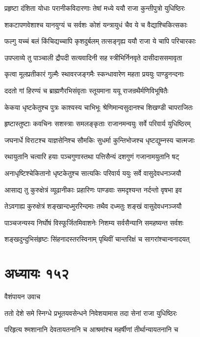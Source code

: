 \twolineshloka
{प्रहृष्टा दंशिता योधाः परानीकविदारणाः}
{तेषां मध्ये ययौ राजा कुन्तीपुत्रो युधिष्ठिरः}


\twolineshloka
{शकटापणवेशाश्च यानयुग्यं च सर्वशः}
{कोशं यन्त्रायुधं चैव ये च वैद्याश्चिकित्सकाः}


\twolineshloka
{फल्गु यच्चं बलं किंचिद्यच्चापि कृशदुर्बलम्}
{तत्सङ्गृह्य ययौ राजा ये चापि परिचारकाः}


\twolineshloka
{उपप्लाव्ये तु पाञ्चाली द्रौपदी सत्यवादिनी}
{सह स्त्रीभिर्निनवृते दासीदाससमावृता}


\twolineshloka
{कृत्वा मूलप्रतीकारं गुल्मैः स्थावरजङ्गमैः}
{स्कन्धावारेण महता प्रययुः पाण्डुनन्दनाः}


\twolineshloka
{ददतो गां हिरण्यं च ब्राह्मणैरभिसंवृताः}
{स्तूयमाना ययू राजन्रथैर्मणिविभूषितैः}


\twolineshloka
{केकया धृष्टकेतुश्च पुत्रः काश्यस्य चाभिभूः}
{श्रेणिमान्वसुदानश्च शिखण्डी चापराजितः}


\twolineshloka
{हृष्टास्तुष्टाः कवचिनः सशस्त्राः समलङ्कृताः}
{राजानमन्वयुः सर्वे परिवार्य युधिष्ठिरम्}


\twolineshloka
{जघनार्धे विराटश्च याज्ञसेनिश्च सौमकिः}
{सुधर्मा कुन्तिभोजश्च धृष्टद्युम्नस्य चात्मजाः}


\twolineshloka
{रथायुतानि चत्वारि हयाः पञ्चगुणास्तथा}
{पत्तिसैन्यं दशगुणं गजानामयुतानि षट्}


\twolineshloka
{अनाधृष्टिश्चेकितानो धृष्टकेतुश्च सात्यकिः}
{परिवार्य ययुः सर्वे वासुदेवधनञ्जयौ}


\twolineshloka
{आसाद्य तु कुरुक्षेत्रं व्यूढानीकाः प्रहारिणः}
{पाण्डवाः समदृश्यन्त नर्दन्तो वृषभा इव}


\twolineshloka
{तेऽवगाह्य कुरुक्षेत्रं शङ्खान्दध्मुररिन्दमाः}
{तथैव दध्मतुः शङ्खं वासुदेवधनञ्जयौ}


\twolineshloka
{पाञ्चजन्यस्य निर्घोषं विस्फूर्जितमिवाशनेः}
{निशम्य सर्वसैन्यानि समहष्यन्त सर्वशः}


\twolineshloka
{शङ्खदुन्दुभिसंहृष्टः सिंहनादस्तरस्विनाम्}
{पृथिवीं चान्तरिक्षं च सागरांश्चान्वनादयत्}


\chapter{अध्यायः १५२}
\twolineshloka
{वैशंपायन उवाच}
{}


\twolineshloka
{ततो देशे समे स्निग्धे प्रभूतयवसेन्धने}
{निवेशयामास तदा सेनां राजा युधिष्ठिरः}


\twolineshloka
{परिहृत्य श्मशानानि देवतायतनानि च}
{आश्रमांश्च महर्षीणां तीर्थान्यायतनानि च}


